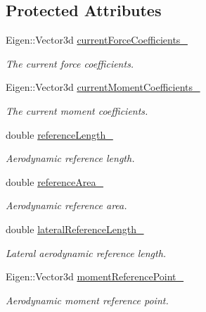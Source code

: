 \subsection*{Protected Attributes}
\begin{DoxyCompactItemize}
\item 
Eigen\+::\+Vector3d \hyperlink{classtudat_1_1aerodynamics_1_1AerodynamicCoefficientInterface_ac2e2b9a55f0269a611599a652a556c9a}{current\+Force\+Coefficients\+\_\+}
\begin{DoxyCompactList}\small\item\em The current force coefficients. \end{DoxyCompactList}\item 
Eigen\+::\+Vector3d \hyperlink{classtudat_1_1aerodynamics_1_1AerodynamicCoefficientInterface_a421867bb3bd06711019c80621ac75473}{current\+Moment\+Coefficients\+\_\+}
\begin{DoxyCompactList}\small\item\em The current moment coefficients. \end{DoxyCompactList}\item 
double \hyperlink{classtudat_1_1aerodynamics_1_1AerodynamicCoefficientInterface_a37ca00d965d756bbf54b727516a33a57}{reference\+Length\+\_\+}
\begin{DoxyCompactList}\small\item\em Aerodynamic reference length. \end{DoxyCompactList}\item 
double \hyperlink{classtudat_1_1aerodynamics_1_1AerodynamicCoefficientInterface_af4588066ab70f6866f5754016c7876c3}{reference\+Area\+\_\+}
\begin{DoxyCompactList}\small\item\em Aerodynamic reference area. \end{DoxyCompactList}\item 
double \hyperlink{classtudat_1_1aerodynamics_1_1AerodynamicCoefficientInterface_addb200a9776750fdc60ae9d5f9291fc8}{lateral\+Reference\+Length\+\_\+}
\begin{DoxyCompactList}\small\item\em Lateral aerodynamic reference length. \end{DoxyCompactList}\item 
Eigen\+::\+Vector3d \hyperlink{classtudat_1_1aerodynamics_1_1AerodynamicCoefficientInterface_a88e4085f5377db07dece01f46badc536}{moment\+Reference\+Point\+\_\+}
\begin{DoxyCompactList}\small\item\em Aerodynamic moment reference point. \end{DoxyCompactList}\item 

\end{DoxyCompactItemize}
